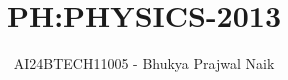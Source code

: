 \documentclass[journal]{IEEEtran}
\begin{document}

\vspace{3cm}

\title{PH:PHYSICS-2013}
\author{AI24BTECH11005 - Bhukya Prajwal Naik
}
{\let\newpage\relax\maketitle}

\renewcommand{\thefigure}{\theenumi}
\renewcommand{\thetable}{\theenumi}
\setlength{\intextsep}{10pt} %


\renewcommand{\thetable}{\theenumi}
\end{document}
